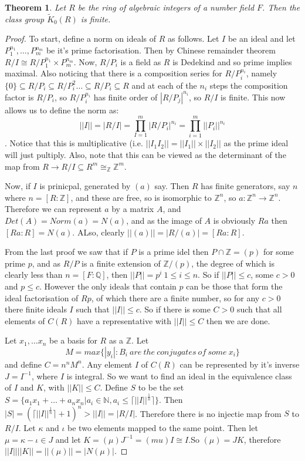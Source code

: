 \documentclass[a4paper,10pt]{article}
\newtheorem{thm}{Theorem}[subsection]
\begin{document}
\begin{thm}
Let $R$ be the ring of algebraic integers of a number field $F$. Then the class group $\tilde{K}_{0}(R)$ is finite.
\end{thm}
\begin{proof}
To start, define a norm on ideals of $R$ as follows. Let $I$ be an ideal and let $P_{1}^{n_{1}},\ldots ,P_{m}^{n_{m}}$ be it's prime factorisation. Then by Chinese remainder theorem $R/I\cong R/P_{1}^{n_{1}}\times P_{m}^{n_{m}}$. Now, $R/P_{i}$ is a field as $R$ is Dedekind and so prime implies maximal. Also noticing that there is a composition series for $R/P_{i}^{n_{i}}$, namely $\{0\}\subseteq R/P_{i}\subseteq R/P_{i}^{2} \ldots \subseteq R/P_{i} \subseteq  R$ and at each of the $n_{i}$ steps the composition factor is $R/P_{i}$, so $R/P_{i}^{n_{i}}$ has finite order of $|R/P_{j}|^{n_{i}}$, so $R/I$ is finite. This now allows us to define the norm as: $$||I||=|R/I|=\prod_{I=1}^{m}|R/P_{i}|^{n_{i}}=\prod_{i=1}^{m}||P_{i}||^{n_{i}}$$.
Notice that this is multiplicative (i.e. $||I_{1}I_{2}||=||I_{1}||\times ||I_{2}||$ as the prime ideal will just pultiply. Also, note that this can be viewed as the determinant of the map from $R\rightarrow R/I\subseteq R^{m}\cong_{\mathbb{Z}} \mathbb{Z}^{m}$.

Now, if $I$ is prinicpal, generated by $(a)$ say. Then $R$ has finite generators, say $n$ where $n=[R:\mathbb{Z}]$, and these are free, so is isomorphic to $\mathbb{Z}^{n}$, so $a:\mathbb{Z}^{n} \rightarrow \mathbb{Z}^{n}$. Therefore we can represent $a$ by a matrix $A$, and $Det(A)=Norm(a)=N(a)$, and as the image of $A$ is obviously $Ra$ then $[Ra:R]=N(a)$. ALso, clearly $||(a)||=|R/(a)|=[Ra:R]$.

From the last proof we saw that if $P$ is a prime idel then $P\cap \mathbb{Z}=(p)$ for some prime $p$, and as $R/P$ is a finite extension of $\mathbb{Z}/(p)$, the degree of which is clearly less than $n=[F:\mathbb{Q}]$, then $||P||=p^{i}\ 1 \leq i \leq n$. So if $||P||\leq c$, some $c>0$ and $p\leq c$. However the only ideals that contain $p$ can be those that form the ideal factorisation of $Rp$, of which there are a finite number, so for any $c>0$ there finite ideals $I$ such that $||I||\leq c$. So if there is some $C>0$ such that all elements of $C(R)$ have a representative with $||I||\leq C$ then we are done.

Let $x_{1},\ldots x_{n}$ be a basis for $R$ as a $\mathbb{Z}$. Let $$M=max\{|y_{i}|:B_{i}\ are\ the\ conjugates\ of\ some\ x_{i}\}$$ and define $C=n^{n}M^{n}$. Any element $I$ of $C(R)$ can be represented by it's inverse $J=I^{-1}$, where $I$ is integral. So we want to find an ideal in the equivalence class of $I$ and $K$, with $||K||\leq C$. Define $S$ to be the set $S=\{a_{1}x_{1}+\ldots +a_{n}x_{n}|a_{i}\in \mathbb{N}, a_{i}\leq \lceil||I||^{\frac{1}{n}}\rceil \}$. Then $|S|=(\lceil||I||^{\frac{1}{n}}\rceil +1)^{n}>||I||=|R/I|$. Therefore there is no injectie map from $S$ to $R/I$. Let $\kappa$ and $\iota$ be two elements mapped to the same point. Then let $\mu =\kappa - \iota \in J$ and let $K=(\mu)J^{-1}=(mu)I\cong I$.So $(\mu )=JK$, therefore $||I||||K||=||(\mu )||=|N(\mu )|$.


\end{proof}
\end{document}
